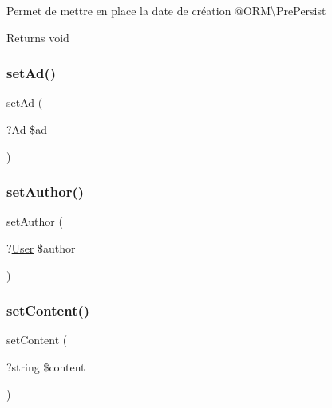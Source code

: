 Permet de mettre en place la date de création @\+O\+RM\textbackslash{}\+Pre\+Persist

\begin{DoxyReturn}{Returns}
void 
\end{DoxyReturn}
\mbox{\label{class_app_1_1_entity_1_1_comment_a3f7c05734d0d1dbedb3ac722e171cc12}} 
\subsubsection{\texorpdfstring{setAd()}{setAd()}}
{\footnotesize\ttfamily set\+Ad (\begin{DoxyParamCaption}\item[{?\mbox{\hyperlink{class_app_1_1_entity_1_1_ad}{Ad}}}]{\$ad }\end{DoxyParamCaption})}

\mbox{\label{class_app_1_1_entity_1_1_comment_adc1408587dab3390f96d6d8bf16324e5}} 
\subsubsection{\texorpdfstring{setAuthor()}{setAuthor()}}
{\footnotesize\ttfamily set\+Author (\begin{DoxyParamCaption}\item[{?\mbox{\hyperlink{class_app_1_1_entity_1_1_user}{User}}}]{\$author }\end{DoxyParamCaption})}

\mbox{\label{class_app_1_1_entity_1_1_comment_adbe841dc05e3e981d41c63dce68f8d20}} 
\subsubsection{\texorpdfstring{setContent()}{setContent()}}
{\footnotesize\ttfamily set\+Content (\begin{DoxyParamCaption}\item[{?string}]{\$content }\end{DoxyParamCaption})}

\mbox{\label{class_app_1_1_entity_1_1_comment_a2308609ef549a753223bbee71e36291e}} 
